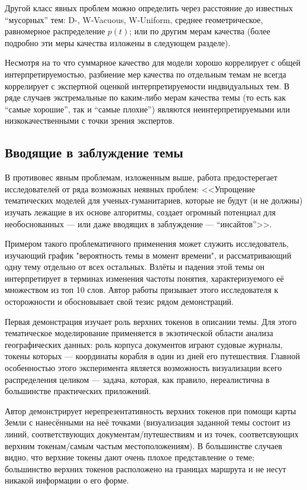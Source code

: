 Другой класс явных проблем можно определить через расстояние до известных ``мусорных'' тем: D-, W-Vacuous, W-Uniform, среднее геометрическое, равномерное распределение $p(t)$; или по другим мерам качества (более подробно эти меры качества изложены в следующем разделе). 

Несмотря на то что суммарное качество для модели хорошо коррелирует с общей интерпретируемостью, разбиение мер качества по отдельным темам не всегда коррелирует с экспертной оценкой интерпретируемости индвидуальных тем. В ряде случаев экстремальные по каким-либо мерам качества темы (то есть как ``самые хорошие'', так и ``самые плохие'') являются неинтерпретируемыми или низкокачественными с точки зрения экспертов.

\subsection{Вводящие в заблуждение темы}

В противовес явным проблемам, изложенным выше, работа \cite{dh_sea} предостерегает исследователей от ряда возможных неявных проблем: <<Упрощение тематических моделей для ученых-гуманитариев, которые не будут (и не должны) изучать лежащие в их основе алгоритмы, создает огромный потенциал для необоснованных --- или даже вводящих в заблуждение --- ``инсайтов''>>. 

Примером такого проблематичного применения может служить исследователь, изучающий график "вероятность темы в момент времени", и рассматривающий одну тему отдельно от всех остальных. Взлёты и падения этой темы он интерпретирует в терминах изменения частоты понятия, характеризуемого её множеством из топ 10 слов. Автор работы призывает этого исследователя к осторожности и обосновывает свой тезис рядом демонстраций.

Первая демонстрация изучает роль верхних токенов в описании темы. Для этого тематическое моделирование применяется в экзотической области анализа географических данных: роль корпуса документов играют судовые журналы, токены которых --- координаты корабля в один из дней его путешествия. Главной особенностью этого эксперимента является возможность визуализации всего распределения целиком --- задача, которая, как правило, нереалистична в большинстве практических приложений.

Автор демонстрирует нерепрезентативность верхних токенов при помощи карты Земли с нанесёнными на неё точками (визуализация заданной темы состоит из линий, соответствующих документам/путешествиям и из точек, соответсвующих верхним токенам/самым частым местоположениям). В большинстве случаев видно, что верхние токены дают очень плохое представление о теме; большинство верхних токенов расположено на границах маршрута и не несут никакой информации о его форме. 

